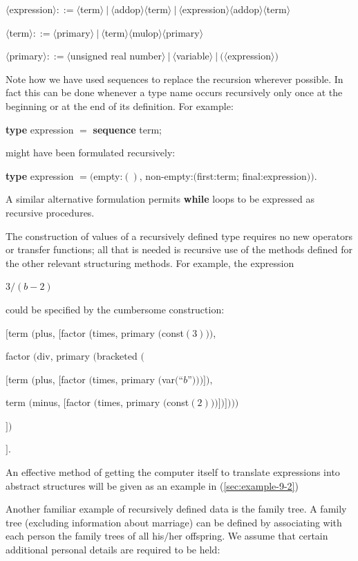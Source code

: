 \documentclass[twoside,11pt]{book}
\begin{document}
\quad $\langle$expression$\rangle ::= \langle$term$\rangle\ |\ \langle$addop$\rangle \langle$term$\rangle\ |\ \langle$expression$\rangle \langle$addop$\rangle \langle$term$\rangle$

\quad $\langle$term$\rangle ::= \langle$primary$\rangle\ |\ \langle$term$\rangle\langle$mulop$\rangle\langle$primary$\rangle$

\quad $\langle$primary$\rangle ::= \langle$unsigned real number$\rangle\ |\ \langle$variable$\rangle\ |\ (\langle$expression$\rangle)$

Note how we have used sequences to replace the recursion wherever possible. In fact this can be done whenever a type name occurs recursively only once at the beginning or at the end of its definition. For example:

\quad \textbf{type} expression $=$ \textbf{sequence} term;

\noindent
might have been formulated recursively:

\quad \textbf{type} expression $= ($empty:$()$, non-empty:$($first:term; final:expression$))$.

\noindent
A similar alternative formulation permits \textbf{while} loops to be expressed as recursive procedures.

The construction of values of a recursively defined type requires no new operators or transfer functions; all that is needed is recursive use of the methods defined for the other relevant structuring methods. For example, the expression

\quad $3/(b - 2)$

\noindent
could be specified by the cumbersome construction:

\quad $[$term $($plus, $[$factor (times, primary $($const$(3)))$,

\tabto*{7.75em} factor $($div, primary $($bracketed $($

\tabto*{9em}  $[$term $($plus, $[$factor $($times, primary $($var$($``$b$''$)))]),$

\tabto*{9.1em}  term $($minus, $[$factor $($times, primary $($const$(2)))])])))$

\tabto*{7.55em}  $])$

\quad $]$.

\noindent
An effective method of getting the computer itself to translate expressions into abstract structures will be given as an example in (\ref{sec:example-9-2})

Another familiar example of recursively defined data is the family tree. A family tree (excluding information about marriage) can be defined by associating with each person the family trees of all his$/$her offspring. We assume that certain additional personal details are required to be held: 
\end{document}
